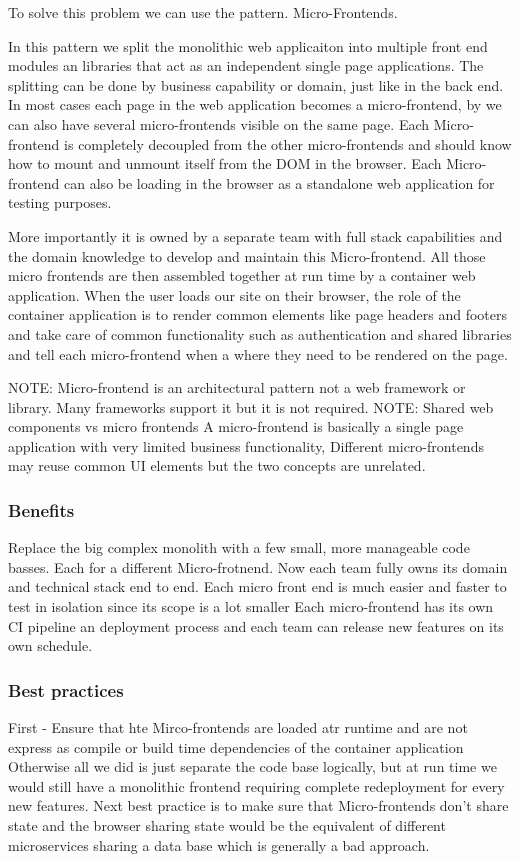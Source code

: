 \documentclass[a4paper, 11pt]{book}
\begin{document}
    To solve this problem we can use the pattern. Micro-Frontends.

    In this pattern we split the monolithic web applicaiton into multiple front end modules an libraries that act as an independent single page applications.
    The splitting can be done by business capability or domain, just like in the back end.
    In most cases each page in the web application becomes a micro-frontend, by we can also have several micro-frontends visible on the same page.
    Each Micro-frontend is completely decoupled from the other micro-frontends and should know how to mount and unmount itself from the DOM in the browser.
    Each Micro-frontend can also be loading in the browser as a standalone web application for testing purposes.

    More importantly it is owned by a separate team with full stack capabilities and the domain knowledge to develop and maintain this Micro-frontend.
    All those micro frontends are then assembled together at run time by a container web application.
    When the user loads our site on their browser, the role of the container application is to render common elements like page headers and footers and take care of common functionality such as authentication and shared libraries and tell each micro-frontend when a where they need to be rendered on the page.

    NOTE: Micro-frontend is an architectural pattern not a web framework or library.
    Many frameworks support it but it is not required.
    NOTE: Shared web components vs micro frontends
    A micro-frontend is basically a single page application with very limited business functionality,
    Different micro-frontends may reuse common UI elements but the two concepts are unrelated.

    \subsubsection{Benefits}
    Replace the big complex monolith with a few small, more manageable code basses. Each for a different Micro-frotnend.
    Now each team fully owns its domain and technical stack end to end.
    Each micro front end is much easier and faster to test in isolation since its scope is a lot smaller
    Each micro-frontend has its own CI pipeline an deployment process and each team can release new features on its own schedule.

    \subsubsection{Best practices}
    First - Ensure that hte Mirco-frontends are loaded atr runtime and are not express as compile or build time dependencies of the container application
    Otherwise all we did is just separate the code base logically, but at run time we would still have a monolithic frontend requiring complete redeployment for every new features.
    Next best practice is to make sure that Micro-frontends don't share state and the browser sharing state would be the equivalent of different microservices sharing a data base which is generally a bad approach.
\end{document}
